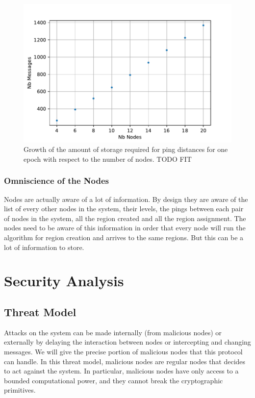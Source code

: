 \documentclass[a4paper,11pt,oneside]{report}
\begin{document}
\begin{figure}[!h] 
\centering
\includegraphics[width=350pt]{figures/storage-plot}
\caption{Growth of the amount of storage required for ping distances for one epoch with
    respect to the number of nodes. \color{red} TODO FIT \color{black} } \label{fig:storage-plot}
\end{figure}

 
\subsubsection{Omniscience of the Nodes}
Nodes are actually aware of a lot of information. By design they are aware of
the list of every other nodes in the system, their levels, the pings between
each pair of nodes in the system, all the region created and all the region
assignment. The nodes need to be aware of this information in order that
every node will run the algorithm for region creation and arrives to the same
regions. But this can be a lot of information to store.

\section{Security Analysis}

\subsection{Threat Model}
Attacks on the system can be made internally (from malicious nodes) or
externally by delaying the interaction between nodes or intercepting and
changing messages. We will give the precise portion of malicious nodes that
this protocol can handle. In this threat model, malicious nodes are regular
nodes that decides to act against the system. In particular, malicious nodes
have only access to a bounded computational power, and they cannot break the
cryptographic primitives. 
\end{document}
